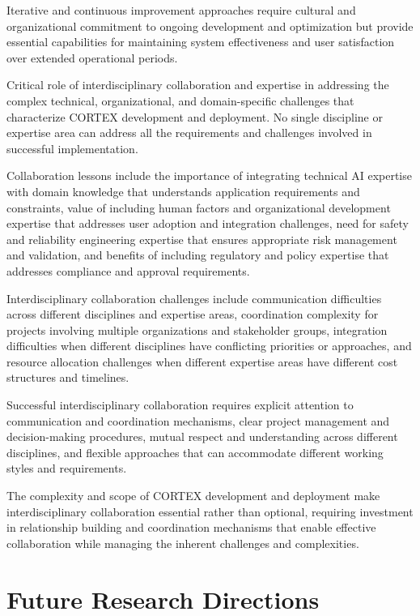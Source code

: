 Iterative and continuous improvement approaches require cultural and organizational commitment to ongoing development and optimization but provide essential capabilities for maintaining system effectiveness and user satisfaction over extended operational periods.

Critical role of interdisciplinary collaboration and expertise in addressing the complex technical, organizational, and domain-specific challenges that characterize CORTEX development and deployment. No single discipline or expertise area can address all the requirements and challenges involved in successful implementation.

Collaboration lessons include the importance of integrating technical AI expertise with domain knowledge that understands application requirements and constraints, value of including human factors and organizational development expertise that addresses user adoption and integration challenges, need for safety and reliability engineering expertise that ensures appropriate risk management and validation, and benefits of including regulatory and policy expertise that addresses compliance and approval requirements.

Interdisciplinary collaboration challenges include communication difficulties across different disciplines and expertise areas, coordination complexity for projects involving multiple organizations and stakeholder groups, integration difficulties when different disciplines have conflicting priorities or approaches, and resource allocation challenges when different expertise areas have different cost structures and timelines.

Successful interdisciplinary collaboration requires explicit attention to communication and coordination mechanisms, clear project management and decision-making procedures, mutual respect and understanding across different disciplines, and flexible approaches that can accommodate different working styles and requirements.

The complexity and scope of CORTEX development and deployment make interdisciplinary collaboration essential rather than optional, requiring investment in relationship building and coordination mechanisms that enable effective collaboration while managing the inherent challenges and complexities.

\section{Future Research Directions}

